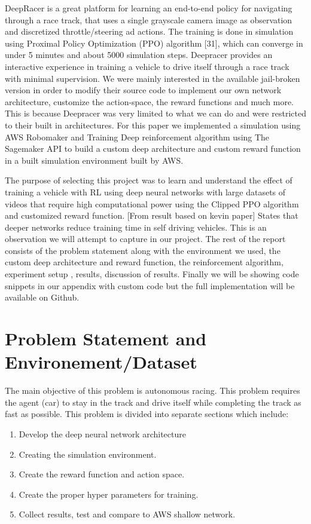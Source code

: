 \documentclass[journal]{IEEEtran}
\begin{document}
DeepRacer is a great platform for learning an end-to-end policy for navigating through a race track, that uses a single grayscale camera image as observation and discretized throttle/steering ad actions. The training is done in simulation using Proximal Policy Optimization (PPO) algorithm [31], which can converge in under 5 minutes and about 5000 simulation steps.
 Deepracer provides an interactive experience in training a vehicle to drive itself through a race track with minimal supervision. We were mainly interested in the available jail-broken version in order to modify their source code to implement our own network architecture, customize the action-space, the reward functions and much more.  This is because Deepracer was very limited to what we can do and were restricted to their built in architectures. For this paper we implemented a simulation using AWS Robomaker and Training Deep reinforcement algorithm using The Sagemaker API to build a custom deep architecture and custom reward function in a built simulation environment built by AWS.  

The purpose of selecting this project was to learn and understand the effect of training a vehicle with RL using deep neural networks with large datasets of videos that require high computational power using the Clipped PPO algorithm and customized reward function.  [From result based on kevin paper] States that deeper networks reduce training time in self driving vehicles.  This is an observation we will attempt to capture in our project.
 The rest of the report consists of the problem statement along with the environment we used, the custom deep architecture and reward function, the reinforcement algorithm, experiment setup , results, discussion of results.  Finally we will be showing code snippets in our appendix with custom code but the full implementation will be available on Github.


\section{Problem Statement and Environement/Dataset}
The main objective of this problem is autonomous racing.  This problem requires the agent (car) to stay in the track and drive itself while completing the track as fast as possible.  This problem is divided into separate sections which include:

\begin{enumerate}
  \item Develop the deep neural network architecture
  \item Creating the simulation environment.
  \item Create the reward function and action space.
  \item Create the proper hyper parameters for training.
  \item Collect results, test and compare to AWS shallow network.
\end{enumerate}
\end{document}
